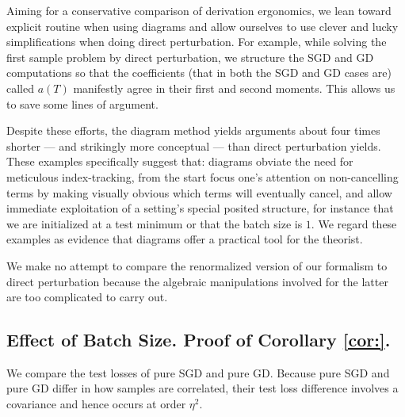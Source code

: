 \documentclass{article}
\theoremstyle{plain}
\theoremstyle{definition}
\begin{document}
    Aiming for a conservative comparison of derivation ergonomics, we lean
    toward explicit routine when using diagrams and allow ourselves to use
    clever and lucky simplifications when doing direct perturbation.  For
    example, while solving the first sample problem by direct perturbation,
    we structure the SGD and GD computations so that the coefficients (that in
    both the SGD and GD cases are) called $a(T)$ manifestly agree in their
    first and second moments.  This allows us to save some lines of argument.

    Despite these efforts, the diagram method yields arguments about four times
    shorter --- and strikingly more conceptual --- than direct perturbation
    yields.  These examples specifically suggest that: diagrams obviate the
    need for meticulous index-tracking, from the start focus one's attention on
    non-cancelling terms by making visually obvious which terms will eventually
    cancel, and allow immediate exploitation of a setting's special posited
    structure, for instance that we are initialized at a test minimum or that
    the batch size is $1$.  We regard these examples as evidence that diagrams
    offer a practical tool for the theorist.

    We make no attempt to compare the renormalized version of our formalism
    to direct perturbation because the algebraic manipulations involved for
    the latter are too complicated to carry out.  

    \subsection{
        Effect of Batch Size.
        Proof of Corollary \ref{cor:}.
    }
        We compare the test losses of pure SGD and pure GD.  Because pure
        SGD and pure GD differ in how samples are correlated, their test loss
        difference involves a covariance and hence occurs at order $\eta^2$.  
\end{document}

